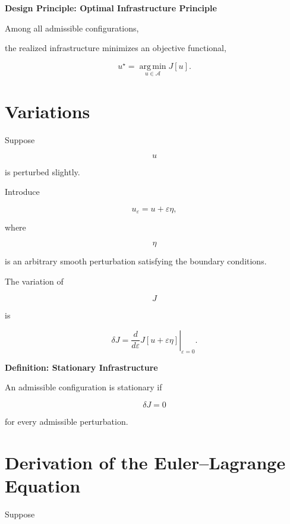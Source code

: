 \documentclass[11pt,fleqn]{book}
\numberwithin{equation}{chapter}
\newenvironment{definition}[1]
  {\begin{definitionEnv}
   \noindent\textbf{Definition: #1}\par\smallskip}
  {\end{definitionEnv}}
\newenvironment{principle}[1]
  {\begin{principleEnv}
   \noindent\textbf{Design Principle: #1}\par\smallskip\itshape}
  {\end{principleEnv}}
\theoremstyle{plain}
\theoremstyle{definition}
\theoremstyle{remark}
\begin{document}
\begin{principle}{Optimal Infrastructure Principle}

Among all admissible configurations,

the realized infrastructure minimizes an objective functional,

\[
\boxed{
u^\star
=
\operatorname*{arg\,min}_{u\in\mathcal A}
J[u].
}
\]

\end{principle}


\section{Variations}

Suppose

\[
u
\]

is perturbed slightly.

Introduce

\[
u_\varepsilon
=
u
+
\varepsilon\eta,
\]

where

\[
\eta
\]

is an arbitrary smooth perturbation satisfying the boundary conditions.

The variation of

\[
J
\]

is

\[
\delta J
=
\left.
\frac d{d\varepsilon}
J[u+\varepsilon\eta]
\right|_{\varepsilon=0}.
\]


\begin{definition}{Stationary Infrastructure}

An admissible configuration is stationary if

\[
\boxed{
\delta J=0
}
\]

for every admissible perturbation.

\end{definition}


\section{Derivation of the Euler--Lagrange Equation}

Suppose
\end{document}
